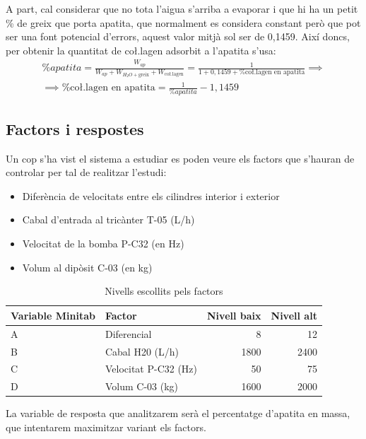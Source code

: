 \documentclass[a4paper]{article}
\begin{document}
A part, cal considerar que no tota l'aigua s'arriba a evaporar i que hi ha un petit \% de greix que porta apatita, que normalment es considera constant però que pot ser una font potencial d'errors, aquest valor mitjà sol ser de 0,1459. Així doncs, per obtenir la quantitat de co\l.lagen adsorbit a l'apatita s'usa:
\begin{gather*}
	\% apatita =
	\frac{W_{ap}}{W_{ap} + W_{H_2O + \text{greix}} + W_{\text{co\l.lagen}}} =
	\frac{1}{1 + 0,1459 + \% \text{co\l.lagen en apatita}} \implies \\
	\implies 
	\boxed{\% \text{co\l.lagen en apatita} = \frac{1}{\% apatita} - 1,1459}
\end{gather*}

\subsection{Factors i respostes}

Un cop s'ha vist el sistema a estudiar es poden veure els factors que s'hauran de controlar per tal de realitzar l'estudi:

\begin{itemize}
	\item Diferència de velocitats entre els cilindres interior i exterior
	\item Cabal d'entrada al tricànter T-05 (L/h)
	\item Velocitat de la bomba P-C32 (en Hz)
	\item Volum al dipòsit C-03 (en kg)
\end{itemize}

\begin{table}[H]
	\centering
	\begin{tabular}{ l | l | r | r }
		\rowcolor{gray!60}
		Variable Minitab & Factor & Nivell baix & Nivell alt \\ \hline
		A & Diferencial & 8 & 12 \\
		B & Cabal H20 (L/h)& 1800 & 2400 \\
		C & Velocitat P-C32 (Hz) & 50 & 75 \\
		D & Volum C-03 (kg) & 1600 & 2000 \\
	\end{tabular}
	\caption{Nivells escollits pels factors}
\end{table}

La variable de resposta que analitzarem serà el percentatge d'apatita en massa, que intentarem maximitzar variant els factors.
\end{document}
